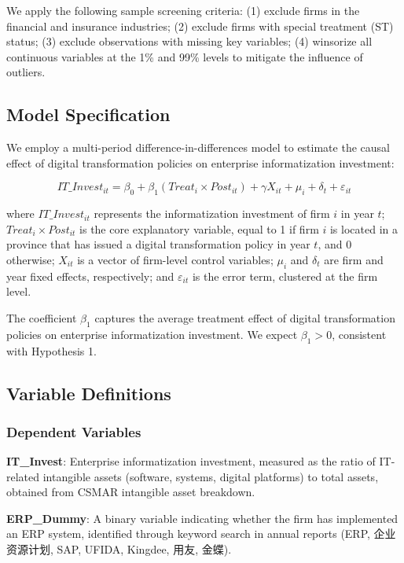 \documentclass[12pt]{article}
\begin{document}
We apply the following sample screening criteria: (1) exclude firms in the financial and insurance industries; (2) exclude firms with special treatment (ST) status; (3) exclude observations with missing key variables; (4) winsorize all continuous variables at the 1\% and 99\% levels to mitigate the influence of outliers.

\subsection{Model Specification}

We employ a multi-period difference-in-differences model to estimate the causal effect of digital transformation policies on enterprise informatization investment:

\begin{equation}
IT\_Invest_{it} = \beta_0 + \beta_1 (Treat_i \times Post_{it}) + \gamma X_{it} + \mu_i + \delta_t + \varepsilon_{it}
\end{equation}

where $IT\_Invest_{it}$ represents the informatization investment of firm $i$ in year $t$; $Treat_i \times Post_{it}$ is the core explanatory variable, equal to 1 if firm $i$ is located in a province that has issued a digital transformation policy in year $t$, and 0 otherwise; $X_{it}$ is a vector of firm-level control variables; $\mu_i$ and $\delta_t$ are firm and year fixed effects, respectively; and $\varepsilon_{it}$ is the error term, clustered at the firm level.

The coefficient $\beta_1$ captures the average treatment effect of digital transformation policies on enterprise informatization investment. We expect $\beta_1 > 0$, consistent with Hypothesis 1.

\subsection{Variable Definitions}

\subsubsection{Dependent Variables}

\textbf{IT\_Invest}: Enterprise informatization investment, measured as the ratio of IT-related intangible assets (software, systems, digital platforms) to total assets, obtained from CSMAR intangible asset breakdown.

\textbf{ERP\_Dummy}: A binary variable indicating whether the firm has implemented an ERP system, identified through keyword search in annual reports (ERP, 企业资源计划, SAP, UFIDA, Kingdee, 用友, 金蝶).
\end{document}
